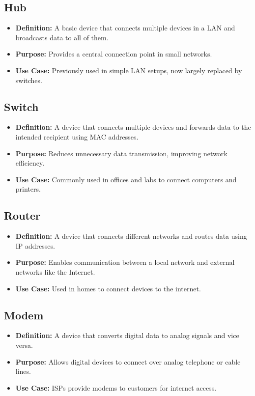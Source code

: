 \subsection{Hub}
\begin{itemize}[leftmargin=1.5cm]
  \item \textbf{Definition:} A basic device that connects multiple devices in a LAN and broadcasts data to all of them.
  \item \textbf{Purpose:} Provides a central connection point in small networks.
  \item \textbf{Use Case:} Previously used in simple LAN setups, now largely replaced by switches.
\end{itemize}

\subsection{Switch}
\begin{itemize}[leftmargin=1.5cm]
  \item \textbf{Definition:} A device that connects multiple devices and forwards data to the intended recipient using MAC addresses.
  \item \textbf{Purpose:} Reduces unnecessary data transmission, improving network efficiency.
  \item \textbf{Use Case:} Commonly used in offices and labs to connect computers and printers.
\end{itemize}

\subsection{Router}
\begin{itemize}[leftmargin=1.5cm]
  \item \textbf{Definition:} A device that connects different networks and routes data using IP addresses.
  \item \textbf{Purpose:} Enables communication between a local network and external networks like the Internet.
  \item \textbf{Use Case:} Used in homes to connect devices to the internet.
\end{itemize}

\subsection{Modem}
\begin{itemize}[leftmargin=1.5cm]
  \item \textbf{Definition:} A device that converts digital data to analog signals and vice versa.
  \item \textbf{Purpose:} Allows digital devices to connect over analog telephone or cable lines.
  \item \textbf{Use Case:} ISPs provide modems to customers for internet access.
\end{itemize}

